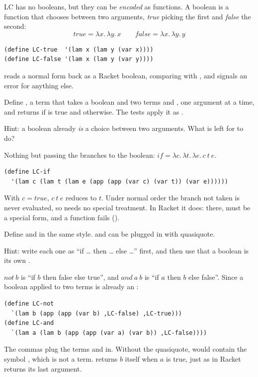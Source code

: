 LC has no booleans, but they can be \emph{encoded} as functions. A boolean is a function that chooses between two arguments, \emph{true} picking the first and \emph{false} the second:
\[
\mathit{true} = \lambda x.\, \lambda y.\, x \qquad \mathit{false} = \lambda x.\, \lambda y.\, y
\]
\begin{lstlisting}
(define LC-true  '(lam x (lam y (var x))))
(define LC-false '(lam x (lam y (var y))))
\end{lstlisting}
 reads a normal form back as a Racket boolean, comparing with , and signals an error for anything else.

\begin{exercise}[If]
Define , a term that takes a boolean  and two terms  and , one argument at a time, and returns  if  is true and  otherwise. The tests apply it as .

Hint: a boolean already \emph{is} a choice between two arguments. What is left for  to do?
\end{exercise}
\begin{solution}
Nothing but passing the branches to the boolean: $\mathit{if} = \lambda c.\, \lambda t.\, \lambda e.\, c\ t\ e$.
\begin{lstlisting}
(define LC-if
  '(lam c (lam t (lam e (app (app (var c) (var t)) (var e))))))
\end{lstlisting}
With $c = \mathit{true}$, $c\ t\ e$ reduces to $t$. Under normal order the branch not taken is never evaluated, so  needs no special treatment. In Racket it does: there,  must be a special form, and a function  fails ().
\end{solution}

\begin{exercise}
Define  and  in the same style.  and  can be plugged in with quasiquote.

Hint: write each one as ``if \dots{} then \dots{} else \dots'' first, and then use that a boolean is its own .
\end{exercise}
\begin{solution}
$\mathit{not}\ b$ is ``if $b$ then false else true'', and $\mathit{and}\ a\ b$ is ``if $a$ then $b$ else false''. Since a boolean applied to two terms is already an :
\begin{lstlisting}
(define LC-not
  `(lam b (app (app (var b) ,LC-false) ,LC-true)))
(define LC-and
  `(lam a (lam b (app (app (var a) (var b)) ,LC-false))))
\end{lstlisting}
The commas plug the terms  and  in. Without the quasiquote,  would contain the symbol , which is not a term.  returns $b$ itself when $a$ is true, just as  in Racket returns its last argument.
\end{solution}

